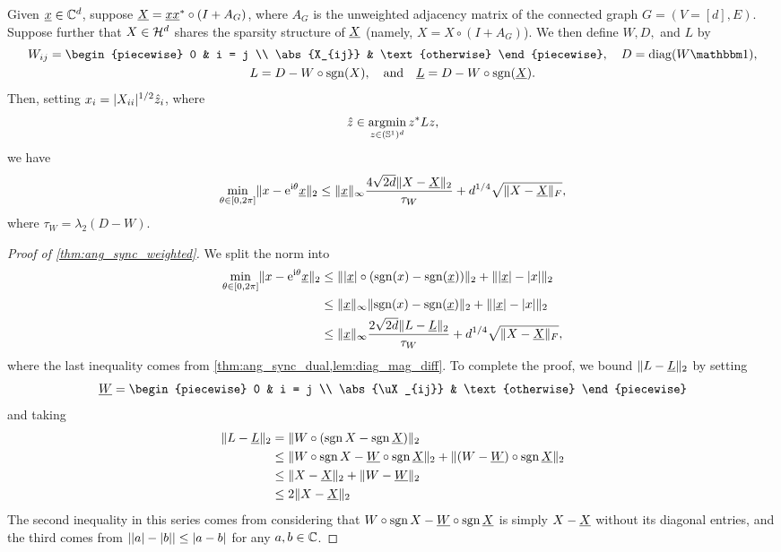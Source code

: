 \begin{corollary}
  Given $\underline{x} \in \mathbb{C}^d$, suppose $\underline{X} = \underline{x} \underline{x}^* \circ (I + A_G)$, where $A_G$ is the unweighted adjacency matrix of the connected graph $G = (V = [d], E)$.  Suppose further that $X \in \mathcal{H}^d$ shares the sparsity structure of $\underline{X}$ (namely, $X = X \circ (I + A_G)$).  We then define $W, D,$ and $L$ by \begin{gather*} W_{ij} = \begin{piecewise} 0 & i = j \\ \abs{X_{ij}} & \text{otherwise} \end{piecewise}, \quad D = \diag(W \one), \\ L = D - W \circ \sgn(X), \quad \text{and} \quad \uL = D - W \circ \sgn(\uX).\end{gather*}  Then, setting $x_i = |X_{ii}|^{1/2} \hat{z}_i$, where \[\hat{z} \in \operatorname*{argmin}_{z \in (\mathbb{S}^1)^d} z^* L z,\] we have \begin{equation} \min_{\theta \in [0, 2 \pi]} \lVert x - \mathrm{e}^{\mathrm{i} \theta} \underline{x}\rVert_2 \le \lVert\underline{x}\rVert_\infty \dfrac{4 \sqrt{2d} \lVert X - \underline{X}\rVert_2}{\tau_W} + d^{1 / 4} \sqrt{\lVert X - \underline{X}\rVert_F}, \label{eq:ang_sync_weighted}\end{equation} where $\tau_W = \lambda_2(D - W)$.
  \label{thm:ang_sync_weighted}
\end{corollary}

\begin{proof}[Proof of \cref{thm:ang_sync_weighted}]
  We split the norm into
  \begin{align*}
    \min_{\theta \in [0, 2\pi]} \lVert x - \mathrm{e}^{\mathrm{i} \theta} \underline{x}\rVert_2 &\le \lVert\lvert\underline{x}\rvert \circ (\operatorname{sgn}(x) - \operatorname{sgn}(\underline{x}))\rVert_2 + \lVert\lvert\underline{x}\rvert - \lvert x\rvert\rVert_2 \\
    &\le \lVert\underline{x}\rVert_\infty \lVert\operatorname{sgn}(x) - \operatorname{sgn}(\underline{x})\rVert_2 + \lVert\lvert\underline{x}\rvert - \lvert x\rvert\rVert_2 \\
    &\le \lVert\underline{x}\rVert_\infty \dfrac{2 \sqrt{2d} \lVert L - \underline{L}\rVert_2}{\tau_W} + d^{1 / 4} \sqrt{\lVert X - \underline{X}\rVert_F},
  \end{align*}
  where the last inequality comes from \cref{thm:ang_sync_dual,lem:diag_mag_diff}.  To complete the proof, we bound $\lVert L - \underline{L}\rVert_2$ by setting \[\uW = \begin{piecewise} 0 & i = j \\ \abs{\uX_{ij}} & \text{otherwise} \end{piecewise}\] and taking
  \begin{align*}
    \lVert L - \underline{L}\rVert_2 &= \lVert W \circ(\operatorname{sgn} X - \operatorname{sgn} \underline{X})\rVert_2 \\
    &\le \lVert W \circ \operatorname{sgn} X - \underline{W} \circ \operatorname{sgn} \underline{X}\rVert_2 + \lVert(W - \underline{W}) \circ \operatorname{sgn} \underline{X}\rVert_2 \\
    &\le \lVert X - \underline{X}\rVert_2 + \lVert W - \underline{W}\rVert_2 \\
    &\le 2 \lVert X - \underline{X}\rVert_2
  \end{align*}
  The second inequality in this series comes from considering that $W \circ \operatorname{sgn} X - \underline{W} \circ \operatorname{sgn} \underline{X}$ is simply $X - \underline{X}$ without its diagonal entries, and the third comes from $\lvert\lvert a\rvert - \lvert b\rvert\rvert \le \lvert a - b\rvert$ for any $a, b \in \mathbb{C}$.
\end{proof}

